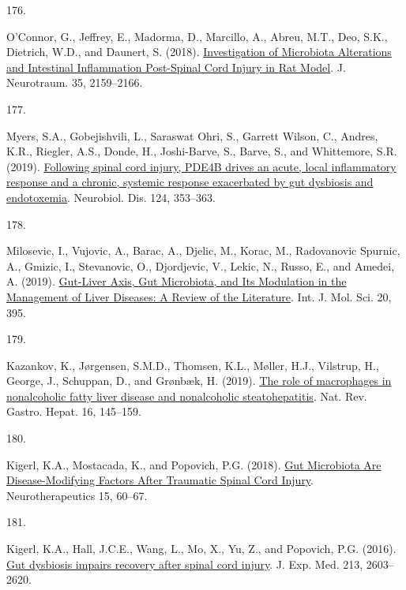 \documentclass[
]{article}
\newlength{\cslhangindent}
\newlength{\csllabelwidth}
\newlength{\cslentryspacingunit} %
\newenvironment{CSLReferences}[2] %
 {%
  \setlength{\parindent}{0pt}
  \ifodd #1
  \let\oldpar\par
  \def\par{\hangindent=\cslhangindent\oldpar}
  \fi
  \setlength{\parskip}{#2\cslentryspacingunit}
 }%
 {}
\newcommand{\CSLLeftMargin}[1]{\parbox[t]{\csllabelwidth}{#1}}
\newcommand{\CSLRightInline}[1]{\parbox[t]{\linewidth - \csllabelwidth}{#1}\break}
\begin{document}
\begin{CSLReferences}{0}{0}
\leavevmode{}%
\CSLLeftMargin{176. }
\CSLRightInline{O'Connor, G., Jeffrey, E., Madorma, D., Marcillo, A., Abreu, M.T., Deo, S.K., Dietrich, W.D., and Daunert, S. (2018). \href{https://doi.org/10.1089/neu.2017.5349}{Investigation of {Microbiota Alterations} and {Intestinal Inflammation Post-Spinal Cord Injury} in {Rat Model}}. J. Neurotraum. 35, 2159--2166.}

\leavevmode{}%
\CSLLeftMargin{177. }
\CSLRightInline{Myers, S.A., Gobejishvili, L., Saraswat Ohri, S., Garrett Wilson, C., Andres, K.R., Riegler, A.S., Donde, H., Joshi-Barve, S., Barve, S., and Whittemore, S.R. (2019). \href{https://doi.org/10.1016/j.nbd.2018.12.008}{Following spinal cord injury, {PDE4B} drives an acute, local inflammatory response and a chronic, systemic response exacerbated by gut dysbiosis and endotoxemia}. Neurobiol. Dis. 124, 353--363.}

\leavevmode{}%
\CSLLeftMargin{178. }
\CSLRightInline{Milosevic, I., Vujovic, A., Barac, A., Djelic, M., Korac, M., Radovanovic Spurnic, A., Gmizic, I., Stevanovic, O., Djordjevic, V., Lekic, N., Russo, E., and Amedei, A. (2019). \href{https://doi.org/10.3390/ijms20020395}{Gut-{Liver Axis}, {Gut Microbiota}, and {Its Modulation} in the {Management} of {Liver Diseases}: {A Review} of the {Literature}}. Int. J. Mol. Sci. 20, 395.}

\leavevmode{}%
\CSLLeftMargin{179. }
\CSLRightInline{Kazankov, K., Jørgensen, S.M.D., Thomsen, K.L., Møller, H.J., Vilstrup, H., George, J., Schuppan, D., and Grønbæk, H. (2019). \href{https://doi.org/10.1038/s41575-018-0082-x}{The role of macrophages in nonalcoholic fatty liver disease and nonalcoholic steatohepatitis}. Nat. Rev. Gastro. Hepat. 16, 145--159.}

\leavevmode{}%
\CSLLeftMargin{180. }
\CSLRightInline{Kigerl, K.A., Mostacada, K., and Popovich, P.G. (2018). \href{https://doi.org/10.1007/s13311-017-0583-2}{Gut {Microbiota Are Disease-Modifying Factors After Traumatic Spinal Cord Injury}}. Neurotherapeutics 15, 60--67.}

\leavevmode{}%
\CSLLeftMargin{181. }
\CSLRightInline{Kigerl, K.A., Hall, J.C.E., Wang, L., Mo, X., Yu, Z., and Popovich, P.G. (2016). \href{https://doi.org/10.1084/jem.20151345}{Gut dysbiosis impairs recovery after spinal cord injury}. J. Exp. Med. 213, 2603--2620.}


\end{CSLReferences}
\end{document}
